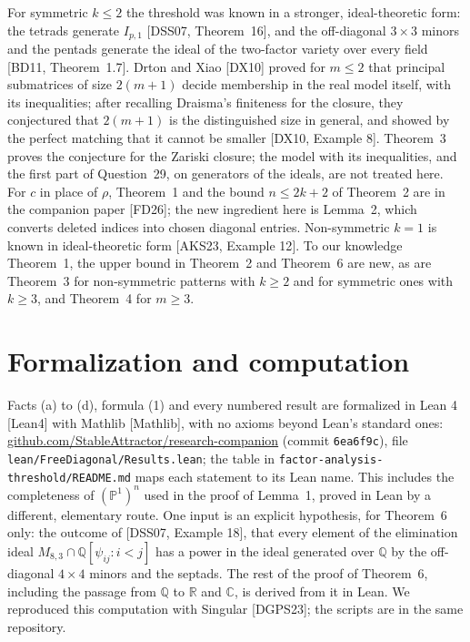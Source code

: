 \documentclass[11pt,letterpaper,reqno]{amsart}
\theoremstyle{spaced}
\begin{document}
For symmetric \(k \le 2\) the threshold was known in a stronger, ideal-theoretic form: the tetrads generate \(I_{p,1}\) {[}DSS07, Theorem~16{]}, and the off-diagonal \(3 \times 3\) minors and the pentads generate the ideal of the two-factor variety over every field {[}BD11, Theorem~1.7{]}. Drton and Xiao {[}DX10{]} proved for \(m \le 2\) that principal submatrices of size \(2(m+1)\) decide membership in the real model itself, with its inequalities; after recalling Draisma's finiteness for the closure, they conjectured that \(2(m+1)\) is the distinguished size in general, and showed by the perfect matching that it cannot be smaller {[}DX10, Example 8{]}. Theorem~3 proves the conjecture for the Zariski closure; the model with its inequalities, and the first part of Question~29, on generators of the ideals, are not treated here. For \(c\) in place of \(\rho\), Theorem~1 and the bound \(n \le 2k+2\) of Theorem~2 are in the companion paper {[}FD26{]}; the new ingredient here is Lemma~2, which converts deleted indices into chosen diagonal entries. Non-symmetric \(k = 1\) is known in ideal-theoretic form {[}AKS23, Example 12{]}. To our knowledge Theorem~1, the upper bound in Theorem~2 and Theorem~6 are new, as are Theorem~3 for non-symmetric patterns with \(k \ge 2\) and for symmetric ones with \(k \ge 3\), and Theorem~4 for \(m \ge 3\).

\hypertarget{formalization-and-computation}{%
\section{Formalization and computation}\label{formalization-and-computation}}

Facts (a) to (d), formula (1) and every numbered result are formalized in Lean 4 {[}Lean4{]} with Mathlib {[}Mathlib{]}, with no axioms beyond Lean's standard ones: \href{https://github.com/StableAttractor/research-companion/tree/6ea6f9c5e396a67cb100720ea44652ff521a2db8}{github.com/\allowbreak{}StableAttractor/\allowbreak{}\mbox{research-companion}} (commit \texttt{6ea6f9c}), file \texttt{lean/\allowbreak{}FreeDiagonal/\allowbreak{}Results.lean}; the table in \texttt{factor-analysis-threshold/\allowbreak{}README.md} maps each statement to its Lean name. This includes the completeness of \((\mathbb{P}^1)^n\) used in the proof of Lemma~1, proved in Lean by a different, elementary route. One input is an explicit hypothesis, for Theorem~6 only: the outcome of {[}DSS07, Example 18{]}, that every element of the elimination ideal \(M_{8,3} \cap \mathbb{Q}[\psi_{ij} : i < j]\) has a power in the ideal generated over \(\mathbb{Q}\) by the off-diagonal \(4 \times 4\) minors and the septads. The rest of the proof of Theorem~6, including the passage from \(\mathbb{Q}\) to \(\mathbb{R}\) and \(\mathbb{C}\), is derived from it in Lean. We reproduced this computation with Singular {[}DGPS23{]}; the scripts are in the same repository.
\end{document}
